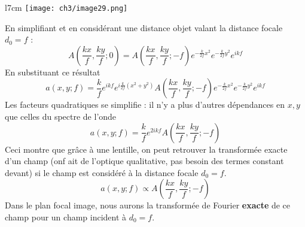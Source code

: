 	\begin{wrapfigure}[10]{l}{7cm}
	\vspace{-5mm}
	\texttt{[image: ch3/image29.png]}
	\end{wrapfigure}
En simplifiant et en considérant une distance objet valant la distance focale $d_0=f$ :
\begin{equation}
A(\frac{kx}{f},\frac{ky}{f};0) = A(\frac{kx}{f},\frac{ky}{f};-f)e^{-\frac{k}{2f}x^2}e^{-\frac{k}{2f}y^2}
e^{ikf}
\end{equation}
En substituant ce résultat 
\begin{equation}
a(x,y;f) = \dfrac{k}{f}e^{ikf} e^{i\frac{k}{2f}(x^2+y^2)}A(\frac{kx}{f},\frac{ky}{f};-f)e^{-\frac{k}{2f}x^2}e^{-\frac{k}{2f}y^2}
e^{ikf}
\end{equation}
Les facteurs quadratiques se simplifie : il n'y a plus d'autres dépendances en $x,y$ que celles du 
spectre de l'onde
\begin{equation}
a(x,y;f) = \dfrac{k}{f}e^{2ikf} A\left(\frac{kx}{f},\frac{ky}{f};-f\right)
\end{equation}
Ceci montre que grâce à une lentille, on peut retrouver la transformée exacte d'un champ (onf ait de 
l'optique qualitative, pas besoin des termes constant devant) si le champ est considéré à la distance 
focale $d_0=f$. 
\begin{equation}
a(x,y;f) \propto A\left(\frac{kx}{f},\frac{ky}{f};-f\right)
\end{equation}
Dans le plan focal image, nous aurons la transformée de Fourier \textbf{exacte} de ce champ pour un 
champ incident à $d_0=f$.








